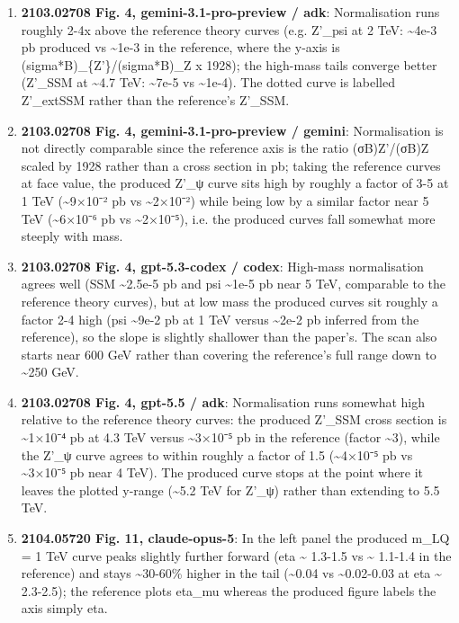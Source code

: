 \begin{enumerate}
\item \textbf{2103.02708 Fig. 4, gemini-3.1-pro-preview / adk}: Normalisation runs roughly 2-4x above the reference theory curves (e.g. Z'\_psi at 2 TeV: \textasciitilde{}4e-3 pb produced vs \textasciitilde{}1e-3 in the reference, where the y-axis is (sigma*B)\_\{Z'\}/(sigma*B)\_Z x 1928); the high-mass tails converge better (Z'\_SSM at \textasciitilde{}4.7 TeV: \textasciitilde{}7e-5 vs \textasciitilde{}1e-4). The dotted curve is labelled Z'\_extSSM rather than the reference's Z'\_SSM.
\item \textbf{2103.02708 Fig. 4, gemini-3.1-pro-preview / gemini}: Normalisation is not directly comparable since the reference axis is the ratio (σB)Z'/(σB)Z scaled by 1928 rather than a cross section in pb; taking the reference curves at face value, the produced Z'\_ψ curve sits high by roughly a factor of 3-5 at 1 TeV (\textasciitilde{}9×10⁻² pb vs \textasciitilde{}2×10⁻²) while being low by a similar factor near 5 TeV (\textasciitilde{}6×10⁻⁶ pb vs \textasciitilde{}2×10⁻⁵), i.e. the produced curves fall somewhat more steeply with mass.
\item \textbf{2103.02708 Fig. 4, gpt-5.3-codex / codex}: High-mass normalisation agrees well (SSM \textasciitilde{}2.5e-5 pb and psi \textasciitilde{}1e-5 pb near 5 TeV, comparable to the reference theory curves), but at low mass the produced curves sit roughly a factor 2-4 high (psi \textasciitilde{}9e-2 pb at 1 TeV versus \textasciitilde{}2e-2 pb inferred from the reference), so the slope is slightly shallower than the paper's. The scan also starts near 600 GeV rather than covering the reference's full range down to \textasciitilde{}250 GeV.
\item \textbf{2103.02708 Fig. 4, gpt-5.5 / adk}: Normalisation runs somewhat high relative to the reference theory curves: the produced Z'\_SSM cross section is \textasciitilde{}1×10⁻⁴ pb at 4.3 TeV versus \textasciitilde{}3×10⁻⁵ pb in the reference (factor \textasciitilde{}3), while the Z'\_ψ curve agrees to within roughly a factor of 1.5 (\textasciitilde{}4×10⁻⁵ pb vs \textasciitilde{}3×10⁻⁵ pb near 4 TeV). The produced curve stops at the point where it leaves the plotted y-range (\textasciitilde{}5.2 TeV for Z'\_ψ) rather than extending to 5.5 TeV.
\item \textbf{2104.05720 Fig. 11, claude-opus-5}: In the left panel the produced m\_LQ = 1 TeV curve peaks slightly further forward (eta \textasciitilde{} 1.3-1.5 vs \textasciitilde{} 1.1-1.4 in the reference) and stays \textasciitilde{}30-60\% higher in the tail (\textasciitilde{}0.04 vs \textasciitilde{}0.02-0.03 at eta \textasciitilde{} 2.3-2.5); the reference plots eta\_mu whereas the produced figure labels the axis simply eta.

\end{enumerate}
